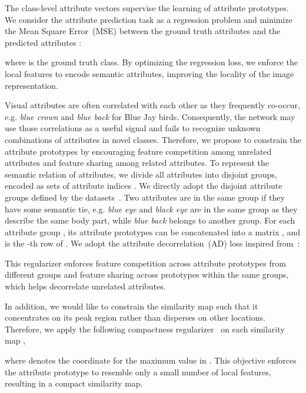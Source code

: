  The class-level attribute vectors supervise the learning of attribute prototypes. We consider the attribute prediction task as a regression problem and minimize the Mean Square Error~(MSE) between the ground truth attributes  and the predicted attributes : 
\begin{linenomath*}
    
\end{linenomath*}
where  is the ground truth class. By optimizing the regression loss, we enforce the local features to encode semantic attributes, improving the locality of the image representation. 

Visual attributes are often correlated with each other as they frequently co-occur, e.g. \textit{blue crown} and \textit{blue back} for Blue Jay birds. 
Consequently, the network may use those correlations as a useful signal and fails to recognize unknown combinations of attributes in novel classes.
Therefore, we propose to constrain the attribute prototypes by encouraging feature competition among unrelated attributes and feature sharing among related attributes. To represent the semantic relation of attributes, we divide all  attributes into  disjoint groups, encoded as  sets of attribute indices . We directly adopt the disjoint attribute groups defined by the datasets~\citep{26_wah2011caltech,32_awa,25_SUNdataset}.
Two attributes are in the same group if they have some semantic tie, e.g. \textit{blue eye} and \textit{black eye} are in the same group as they describe the same body part, while \textit{blue back} belongs to another group.  
For each attribute group , its attribute prototypes  can be concatenated into a matrix , and  is the -th row of . We adopt the attribute decorrelation~(AD) loss inspired from~\citet{jayaraman2014decorrelating}: 
\begin{linenomath*}

\end{linenomath*}
This regularizer enforces feature competition across attribute prototypes from different groups and feature sharing across prototypes within the same groups, which helps decorrelate unrelated attributes. 





In addition, we would like to constrain the similarity map such that it concentrates on its peak region rather than disperses on other locations.  Therefore, we apply the following compactness regularizer~\citep{zheng2017learning} on each similarity map ,
\begin{linenomath*}

\end{linenomath*}
where  denotes the coordinate for the maximum value in . This objective enforces the attribute prototype to resemble only a small number of local features, resulting in a compact similarity map. 



